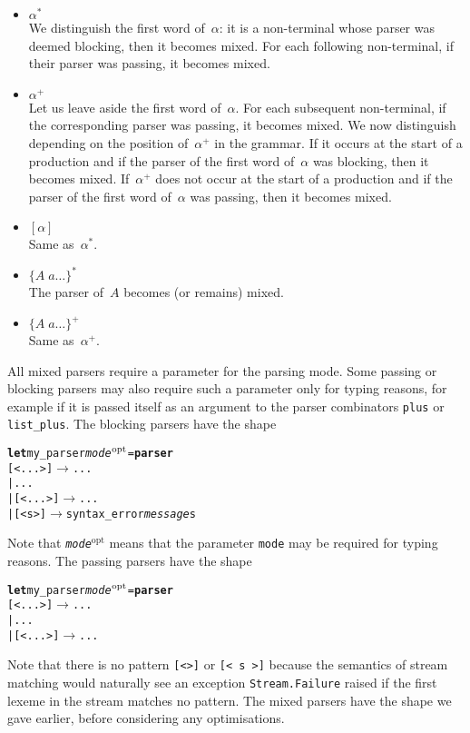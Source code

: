 \begin{itemize}

  \item \(\alpha^*\)\\ We distinguish the first word of~\(\alpha\):
    it is a non\hyp{}terminal whose parser was deemed blocking, then
    it becomes mixed. For each following non\hyp{}terminal, if their
    parser was passing, it becomes mixed.

  \item \(\alpha^+\)\\ Let us leave aside the first word
    of~\(\alpha\). For each subsequent non\hyp{}terminal, if the
    corresponding parser was passing, it becomes mixed. We now
    distinguish depending on the position of~\(\alpha^+\) in the
    grammar. If it occurs at the start of a production and if the
    parser of the first word of~\(\alpha\) was blocking, then it
    becomes mixed. If~\(\alpha^+\) does not occur at the start of a
    production and if the parser of the first word of~\(\alpha\)
    was passing, then it becomes mixed.

  \item \([\alpha]\)\\ Same as~\(\alpha^*\).

  \item \(\{A \; a \ldots\}^*\)\\ The parser of~\(A\) becomes (or
    remains) mixed.

  \item \(\{A \; a \ldots\}^+\)\\ Same as~\(\alpha^+\).

\end{itemize}
All mixed parsers require a parameter for the parsing mode. Some
passing or blocking parsers may also require such a parameter only for
typing reasons, for example if it is passed itself as an argument to
the parser combinators \texttt{plus} or \texttt{list\_plus}. The
blocking parsers have the shape
\begin{alltt}
\textbf{let} my\_parser \emph{mode\(\sp{\text{opt}}\)} = \textbf{parser}
  [< ... >] \(\rightarrow\) ...
| ...
| [< ... >] \(\rightarrow\) ...
|   [< s >] \(\rightarrow\) syntax\_error \emph{message} s
\end{alltt}
Note that \texttt{\emph{mode\(^{\text{opt}}\)}} means that the
parameter \texttt{mode} may be required for typing reasons. The
passing parsers have the shape
\begin{alltt}
\textbf{let} my\_parser \emph{mode\(\sp{\text{opt}}\)} = \textbf{parser}
  [< ... >] \(\rightarrow\) ...
| ...
| [< ... >] \(\rightarrow\) ...
\end{alltt}
Note that there is no pattern \texttt{[<>]} or \texttt{[< s >]}
because the semantics of stream matching would naturally see an
exception \texttt{Stream.Failure} raised if the first lexeme in the
stream matches no pattern. The mixed parsers have the shape we gave
earlier, before considering any optimisations.

